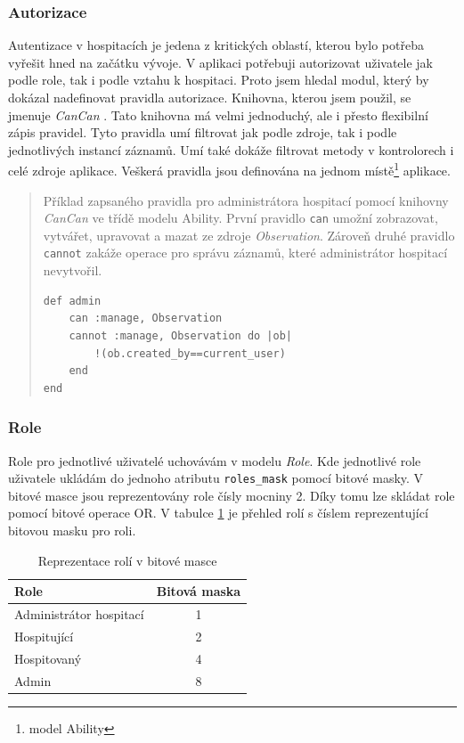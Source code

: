 \subsubsection{Autorizace}
Autentizace v hospitacích je jedena z kritických oblastí, kterou bylo potřeba vyřešit hned na začátku vývoje. V aplikaci potřebuji autorizovat uživatele jak podle role, tak i podle vztahu k hospitaci. Proto jsem hledal modul, který by dokázal nadefinovat pravidla autorizace. Knihovna, kterou jsem použil, se jmenuje \textit{CanCan} \cite{cancan} . Tato knihovna má velmi jednoduchý, ale i přesto flexibilní zápis pravidel. Tyto pravidla umí filtrovat jak podle zdroje, tak i podle jednotlivých instancí záznamů. Umí také dokáže filtrovat metody v kontrolorech i celé zdroje aplikace. Veškerá pravidla jsou definována na jednom místě\footnote{model Ability} aplikace.

\begin{quote}
Příklad zapsaného pravidla pro administrátora hospitací pomocí knihovny \textit{CanCan} ve třídě modelu Ability. První pravidlo \verb|can| umožní zobrazovat, vytvářet, upravovat a mazat ze zdroje \textit{Observation}. Zároveň druhé pravidlo \verb|cannot| zakáže operace pro správu záznamů, které administrátor hospitací nevytvořil.

\begin{verbatim}
def admin
    can :manage, Observation
    cannot :manage, Observation do |ob|
        !(ob.created_by==current_user)
    end
end
\end{verbatim} 
\end{quote}

\subsubsection{Role}
\label{sec:role}
Role pro jednotlivé uživatelé uchovávám v modelu \textit{Role}. Kde jednotlivé role uživatele ukládám do jednoho atributu \verb|roles_mask| pomocí bitové masky. V bitové masce jsou reprezentovány role čísly mocniny 2. Díky tomu lze skládat role pomocí bitové operace OR. V tabulce \ref{tab:role} je přehled rolí s číslem reprezentující bitovou masku pro roli.

\begin{table}[h]
\begin{center}
\begin{tabular}{|l|c|}

\hline
\textbf{Role} & \textbf{Bitová maska} \\ \hline
Administrátor hospitací & 1 \\
Hospitující & 2 \\ 
Hospitovaný & 4 \\
Admin & 8 \\\hline

\end{tabular}
\caption{Reprezentace rolí v bitové masce}
\label{tab:role}
\end{center}
\end{table}

